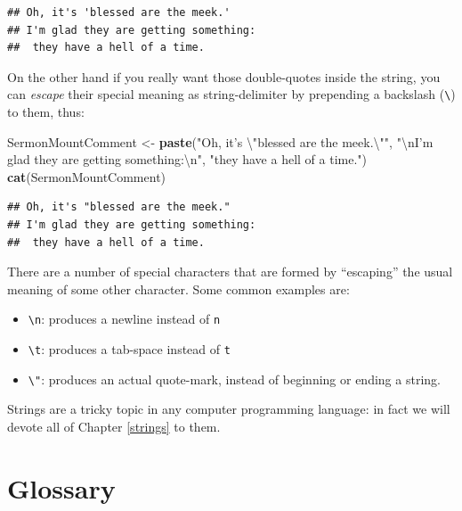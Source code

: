 \documentclass[]{book}
\makeatletter
\newenvironment{Shaded}{\begin{snugshade}}{\end{snugshade}}
\newcommand{\KeywordTok}[1]{\textcolor[rgb]{0.13,0.29,0.53}{\textbf{{#1}}}}
\newcommand{\CharTok}[1]{\textcolor[rgb]{0.31,0.60,0.02}{{#1}}}
\newcommand{\StringTok}[1]{\textcolor[rgb]{0.31,0.60,0.02}{{#1}}}
\newcommand{\NormalTok}[1]{{#1}}
\providecommand{\tightlist}{%
  \setlength{\itemsep}{0pt}\setlength{\parskip}{0pt}}
\newenvironment{kframe}{%
\medskip{}
\setlength{\fboxsep}{.8em}
 \def\at@end@of@kframe{}%
 \ifinner\ifhmode%
  \def\at@end@of@kframe{\end{minipage}}%
  \begin{minipage}{\columnwidth}%
 \fi\fi%
 \def\FrameCommand##1{\hskip\@totalleftmargin \hskip-\fboxsep
 \colorbox{shadecolor}{##1}\hskip-\fboxsep
     \hskip-\linewidth \hskip-\@totalleftmargin \hskip\columnwidth}%
 \MakeFramed {\advance\hsize-\width
   \@totalleftmargin\z@ \linewidth\hsize
   \@setminipage}}%
 {\par\unskip\endMakeFramed%
 \at@end@of@kframe}
\renewenvironment{Shaded}{\begin{kframe}}{\end{kframe}}
\theoremstyle{definition}
\theoremstyle{definition}
\theoremstyle{remark}
\makeatother
\begin{document}
\begin{verbatim}
## Oh, it's 'blessed are the meek.' 
## I'm glad they are getting something:
##  they have a hell of a time.
\end{verbatim}

On the other hand if you really want those double-quotes inside the
string, you can \emph{escape} their special meaning as string-delimiter
by prepending a backslash (\texttt{\textbackslash{}}) to them, thus:

\begin{Shaded}
\begin{Highlighting}[]
\NormalTok{SermonMountComment <-}\StringTok{ }\KeywordTok{paste}\NormalTok{(}\StringTok{"Oh, it's }\CharTok{\textbackslash{}"}\StringTok{blessed are the meek.}\CharTok{\textbackslash{}"}\StringTok{"}\NormalTok{,}
                     \StringTok{"}\CharTok{\textbackslash{}n}\StringTok{I'm glad they are getting something:}\CharTok{\textbackslash{}n}\StringTok{"}\NormalTok{,}
                     \StringTok{"they have a hell of a time."}\NormalTok{)}
\KeywordTok{cat}\NormalTok{(SermonMountComment)}
\end{Highlighting}
\end{Shaded}

\begin{verbatim}
## Oh, it's "blessed are the meek." 
## I'm glad they are getting something:
##  they have a hell of a time.
\end{verbatim}

There are a number of special characters that are formed by ``escaping''
the usual meaning of some other character. Some common examples are:

\begin{itemize}
\tightlist
\item
  \texttt{\textbackslash{}n}: produces a newline instead of \texttt{n}
\item
  \texttt{\textbackslash{}t}: produces a tab-space instead of \texttt{t}
\item
  \texttt{\textbackslash{}"}: produces an actual quote-mark, instead of
  beginning or ending a string.
\end{itemize}

Strings are a tricky topic in any computer programming language: in fact
we will devote all of Chapter \ref{strings} to them.

\newpage

\section*{Glossary}\label{idea-glossary}
\end{document}
